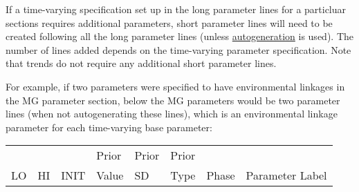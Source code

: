 {%


	 


If a time-varying specification set up in the long parameter lines for a particluar sections requires additional parameters, short parameter lines will need to be created following all the long parameter lines (unless \hyperlink{autogen}{autogeneration} is used). The number of lines added depends on the time-varying parameter specification. Note that trends do not require any additional short parameter lines.

For example, if two parameters were specified to have environmental linkages in the MG parameter section, below the MG parameters would be two parameter lines (when not autogenerating these lines), which is an environmental linkage parameter for each time-varying base parameter:
\begin{longtable}{ p{0.7cm} p{0.7cm} p{0.7cm}  p{1cm}  p{1.4cm}  p{1cm} p{1cm} p{6.7cm}  }
	\hline
	   &    &      & Prior &  Prior & Prior & & \Tstrut\\
	LO & HI & INIT & Value &  SD    & Type  & Phase & Parameter Label \Bstrut\\
	\hline
	\endfirsthead
	

\end{longtable}}
